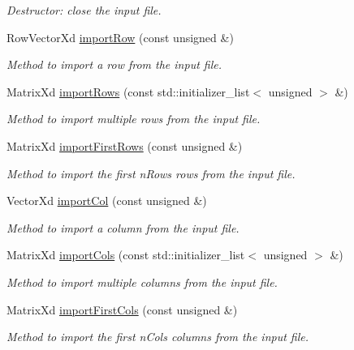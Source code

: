 \begin{DoxyCompactItemize}
\begin{DoxyCompactList}\small\item\em Destructor\-: close the input file. \end{DoxyCompactList}\item 
Row\-Vector\-Xd \hyperlink{classCsvParser_a1ffc9952a2ceb0d2fd8216c0db327a63}{import\-Row} (const unsigned \&)
\begin{DoxyCompactList}\small\item\em Method to import a row from the input file. \end{DoxyCompactList}\item 
Matrix\-Xd \hyperlink{classCsvParser_aecc038e4b8d0db2b62d97a6d9fc639d7}{import\-Rows} (const std\-::initializer\-\_\-list$<$ unsigned $>$ \&)
\begin{DoxyCompactList}\small\item\em Method to import multiple rows from the input file. \end{DoxyCompactList}\item 
Matrix\-Xd \hyperlink{classCsvParser_ade6a3f28e28a86dcad0251d16b9a59b9}{import\-First\-Rows} (const unsigned \&)
\begin{DoxyCompactList}\small\item\em Method to import the first {\itshape n\-Rows} rows from the input file. \end{DoxyCompactList}\item 
Vector\-Xd \hyperlink{classCsvParser_a3ca9f7023c42fcabe6e31e54d6cfdc16}{import\-Col} (const unsigned \&)
\begin{DoxyCompactList}\small\item\em Method to import a column from the input file. \end{DoxyCompactList}\item 
Matrix\-Xd \hyperlink{classCsvParser_a25c5604cd3cd6061b9c7e7c3e8efc779}{import\-Cols} (const std\-::initializer\-\_\-list$<$ unsigned $>$ \&)
\begin{DoxyCompactList}\small\item\em Method to import multiple columns from the input file. \end{DoxyCompactList}\item 
Matrix\-Xd \hyperlink{classCsvParser_a47d7037e91224c1d3e2817489d939bf8}{import\-First\-Cols} (const unsigned \&)
\begin{DoxyCompactList}\small\item\em Method to import the first {\itshape n\-Cols} columns from the input file. \end{DoxyCompactList}\item 

\end{DoxyCompactItemize}
